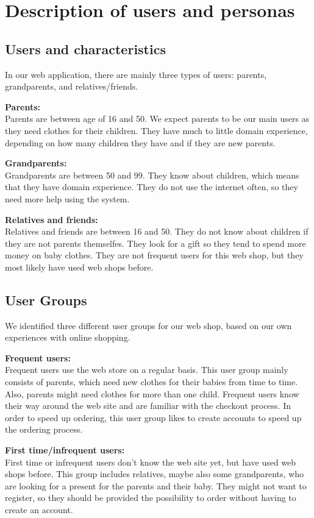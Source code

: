 \section{Description of users and personas}
\subsection{Users and characteristics}

In our web application, there are mainly three types of users: parents,  grandparents, and relatives/friends.

\noindent\textbf{Parents:}\\
Parents are between age of 16 and 50. We expect parents to be our main users as they need clothes for their children. They have much to little domain experience, depending on how many children they have and if they are new parents.

\noindent\textbf{Grandparents:}\\
Grandparents are between 50 and 99. They know about children, which means that they have domain experience. They do not use the internet often, so they need more help using the system.
 
\noindent\textbf{Relatives and friends:}\\
Relatives and friends are between 16 and 50. They do not know about children if they are not parents themselfes. They look for a gift so they tend to spend more money on baby clothes. They are not frequent users for this web shop, but they most likely have used web shops before.

\subsection{User Groups}
We identified three different user groups for our web shop, based on our own experiences with online shopping.
 
\noindent\textbf{Frequent users:}\\
Frequent users use the web store on a regular basis. This user group mainly consists of parents, which need new clothes for their babies from time to time. Also, parents might need clothes for more than one child. Frequent users know their way around the web site and are familiar with the checkout process. In order to speed up ordering, this user group likes to create accounts to speed up the ordering process. 

\noindent\textbf{First time/infrequent users:}\\
First time or infrequent users don't know the web site yet, but have used web shops before. This group includes relatives, maybe also some grandparents, who are looking for a present for the parents and their baby. They might not want to register, so they should be provided the possibility to order without having to create an account.
 
